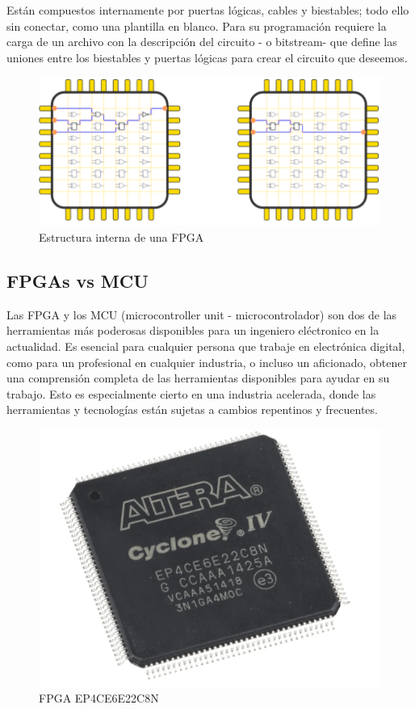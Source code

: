 Están compuestos internamente por puertas lógicas, cables y biestables; todo ello sin conectar, como una plantilla en blanco. Para su programación requiere la carga de un archivo con la descripción del circuito - o bitstream- que define las uniones entre los biestables y puertas lógicas para crear el circuito que deseemos. 

\begin{figure}[H]
	\center
	\includegraphics[scale=0.6]{imagenes/Herramientas/FPGA.png}
	\caption{Estructura interna de una FPGA}
	\label{fig:Estructura interna de una FPGA}
\end{figure}

\subsection{FPGAs vs MCU}

Las FPGA y los MCU (microcontroller unit - microcontrolador) son dos de las herramientas más poderosas disponibles para un ingeniero eléctronico en la actualidad. Es esencial para cualquier persona que trabaje en electrónica digital, como para un profesional en cualquier industria, o incluso un aficionado, obtener una comprensión completa de las herramientas disponibles para ayudar en su trabajo. Esto es especialmente cierto en una industria acelerada, donde las herramientas y tecnologías están sujetas a cambios repentinos y frecuentes.\newline

\begin{figure}[H]
	\center
	\includegraphics[scale=0.6]{imagenes/Herramientas/FPGA2.png}
	\caption{FPGA EP4CE6E22C8N}
	\label{fig:FPGA EP4CE6E22C8N}
\end{figure}


